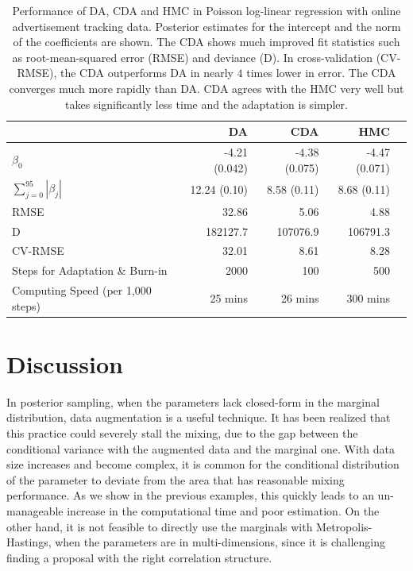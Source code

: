 \documentclass[10pt]{article}
\begin{document}
\begin{table}[H]
\centering
\begin{tabular}{|l |r |r| r| r |} 
 \hline
                          & DA & CDA & HMC\\
 [0.5ex]
 \hline
$\beta_0$                         & -4.21 (0.042)& -4.38 (0.075) & -4.47 (0.071) \\
$\sum_{j=0}^{95} |\beta_j|$         & 12.24 (0.10)&  8.58 (0.11)  & 8.68 (0.11)  \\
RMSE                              & 32.86        & 5.06          & 4.88\\
D                                 & 182127.7     & 107076.9      & 106791.3\\
CV-RMSE                           & 32.01        & 8.61          & 8.28\\
Steps for Adaptation \& Burn-in                & 2000         & 100            & 500 \\
Computing Speed (per 1,000 steps)  & 25 mins       & 26 mins        & 300 mins\\
 \hline
\end{tabular}
\caption{Performance of DA, CDA and HMC in Poisson log-linear regression with online advertisement tracking data. Posterior estimates for the intercept and the norm of the coefficients are shown. The CDA shows much improved fit statistics such as root-mean-squared error (RMSE) and deviance (D). In cross-validation (CV-RMSE), the CDA outperforms DA in nearly $4$ times lower in error. The CDA converges much more rapidly than DA. CDA agrees with the HMC very well but takes significantly less time and the adaptation is simpler.}
\label{table:Poisson}
\end{table}


\section{Discussion}

In posterior sampling, when the parameters lack closed-form in the marginal distribution, data augmentation is a useful technique. It has been realized that this practice could severely stall the mixing, due to the gap between the conditional variance with the augmented data and the marginal one. With data size increases and become complex, it is common for the conditional distribution of the parameter to deviate from the area that has reasonable mixing performance. As we show in the previous examples, this quickly leads to an un-manageable increase in the computational time and poor estimation. On the other hand, it is not feasible to directly use the marginals with Metropolis-Hastings, when the parameters are in multi-dimensions, since it is challenging  finding a proposal with the right correlation structure.
\end{document}
